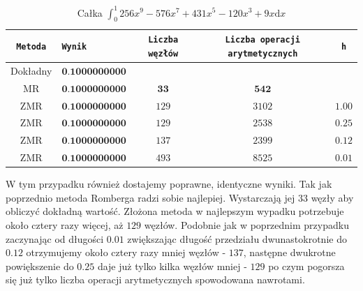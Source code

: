 \documentclass[11pt,leqno]{article}
\begin{document}
\begin{center}\begin{table}[ht]\begin{center}
    \caption{Całka $\int_{0}^{1}256x^9 - 576x^7 + 431x^5 - 120x^3 + 9x\mathrm{d}x$}
    \begin{tabular}{|c|l|c|c|c|} \hline
        \texttt{Metoda} & \texttt{Wynik}            & \texttt{Liczba węzłów} & \texttt{Liczba operacji arytmetycznych} & \texttt{h} \\ \hline
        Dokładny        & $\textbf{0.1000000000}$   &                        &                                         &            \\ \hline
        MR              & $\textbf{0.1000000000}$   & $\textbf{33}$          & $\textbf{542}$                          &            \\ \hline
        ZMR             & $\textbf{0.1000000000}$   & $129$                  & $3102$                                  & $1.00$     \\ \hline
        ZMR             & $\textbf{0.1000000000}$   & $129$                  & $2538$                                  & $0.25$     \\ \hline
        ZMR             & $\textbf{0.1000000000}$   & $137$                  & $2399$                                  & $0.12$     \\ \hline
        ZMR             & $\textbf{0.1000000000}$   & $493$                  & $8525$                                  & $0.01$     \\ \hline
    \end{tabular}
\end{center}\end{table}\end{center}

W tym przypadku również dostajemy poprawne, identyczne wyniki. Tak jak poprzednio
metoda Romberga radzi sobie najlepiej. Wystarczają jej $33$ węzły aby obliczyć
dokładną wartość. Złożona metoda w najlepszym wypadku potrzebuje około cztery
razy więcej, aż $129$ węzłów. Podobnie jak w poprzednim przypadku zaczynając od długości
$0.01$ zwiększając długość przedziału dwunastokrotnie do $0.12$ otrzymujemy
około cztery razy mniej węzłów - $137$, następne dwukrotne powiększenie do $0.25$
daje już tylko kilka węzłów mniej - $129$ po czym pogorsza się już tylko liczba
operacji arytmetycznych spowodowana nawrotami.

\newpage
\end{document}
